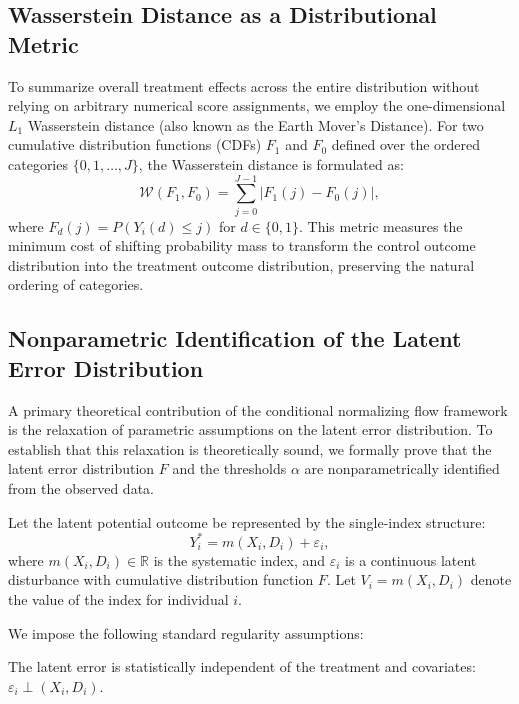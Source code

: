 \documentclass{article}
\numberwithin{figure}{section}
\numberwithin{table}{section}
\numberwithin{equation}{section}
\begin{document}
\subsection{Wasserstein Distance as a Distributional Metric}
\label{appsub:wasserstein}

To summarize overall treatment effects across the entire distribution without relying on arbitrary numerical score assignments, we employ the one-dimensional $L_1$ Wasserstein distance (also known as the Earth Mover's Distance). For two cumulative distribution functions (CDFs) $F_1$ and $F_0$ defined over the ordered categories $\{0, 1, \dots, J\}$, the Wasserstein distance is formulated as:
\begin{equation}
\mathcal{W}(F_1, F_0) = \sum_{j=0}^{J-1} \left| F_1(j) - F_0(j) \right|,
\end{equation}
where $F_d(j) = P(Y_i(d) \le j)$ for $d \in \{0,1\}$. This metric measures the minimum cost of shifting probability mass to transform the control outcome distribution into the treatment outcome distribution, preserving the natural ordering of categories.

\subsection{Nonparametric Identification of the Latent Error Distribution}
\label{appsub:identification}

A primary theoretical contribution of the conditional normalizing flow framework is the relaxation of parametric assumptions on the latent error distribution. To establish that this relaxation is theoretically sound, we formally prove that the latent error distribution $F$ and the thresholds $\alpha$ are nonparametrically identified from the observed data.

Let the latent potential outcome be represented by the single-index structure:
\begin{equation}
Y_i^* = m(X_i, D_i) + \varepsilon_i,
\end{equation}
where $m(X_i, D_i) \in \mathbb{R}$ is the systematic index, and $\varepsilon_i$ is a continuous latent disturbance with cumulative distribution function $F$. Let $V_i = m(X_i, D_i)$ denote the value of the index for individual $i$. 

We impose the following standard regularity assumptions:
\begin{assumption}[Exogeneity]
The latent error is statistically independent of the treatment and covariates: $\varepsilon_i \perp (X_i, D_i)$.
\label{ass:exogeneity}
\end{assumption}
\end{document}
